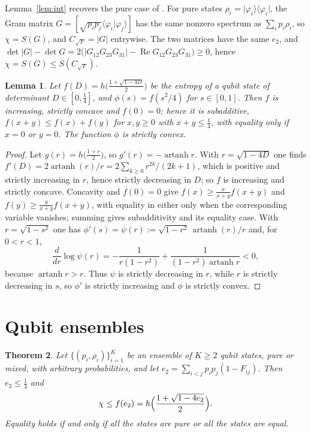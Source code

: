 \documentclass[11pt,a4paper]{article}
\newtheorem{theorem}{Theorem}
\newtheorem{lemma}[theorem]{Lemma}
\theoremstyle{definition}
\theoremstyle{plain}
\DeclareMathOperator{\artanh}{artanh}
\newcommand{\ket}[1]{\lvert#1\rangle}
\newcommand{\bra}[1]{\langle#1\rvert}
\newcommand{\braket}[2]{\langle#1\vert#2\rangle}
\newcommand{\CF}{C_{\sqrt F}}
\begin{document}
Lemma~\ref{lem:int} recovers the pure case of \cite{FdMRZ2012}. For pure
states $\rho_i=\ket{\varphi_i}\bra{\varphi_i}$, the Gram matrix
$G=[\sqrt{p_ip_j}\braket{\varphi_i}{\varphi_j}]$ has the same nonzero spectrum
as $\sum_ip_i\rho_i$, so $\chi=S(G)$, and $\CF=|G|$ entrywise. The two
matrices have the same $e_2$, and
$\det|G|-\det G=2\bigl(|G_{12}G_{23}G_{31}|-\operatorname{Re}G_{12}G_{23}G_{31}\bigr)\ge0$,
hence $\chi=S(G)\le S(\CF)$.

\begin{lemma}\label{lem:qubit}
Let $f(D)=h\bigl(\tfrac{1+\sqrt{1-4D}}{2}\bigr)$ be the entropy of a qubit
state of determinant $D\in[0,\tfrac14]$, and $\phi(s)=f(s^2/4)$ for
$s\in[0,1]$. Then $f$ is increasing, strictly concave and $f(0)=0$; hence it
is subadditive, $f(x+y)\le f(x)+f(y)$ for $x,y\ge0$ with $x+y\le\tfrac14$, with
equality only if $x=0$ or $y=0$. The function $\phi$ is strictly convex.
\end{lemma}

\begin{proof}
Let $g(r)=h\bigl(\tfrac{1+r}{2}\bigr)$, so $g'(r)=-\artanh r$. With
$r=\sqrt{1-4D}$ one finds $f'(D)=2\artanh(r)/r=2\sum_{k\ge0}r^{2k}/(2k+1)$,
which is positive and strictly increasing in $r$, hence strictly decreasing in
$D$; so $f$ is increasing and strictly concave. Concavity and $f(0)=0$ give
$f(x)\ge\frac{x}{x+y}f(x+y)$ and $f(y)\ge\frac{y}{x+y}f(x+y)$, with equality in
either only when the corresponding variable vanishes; summing gives
subadditivity and its equality case. With $r=\sqrt{1-s^2}$ one has
$\phi'(s)=\psi(r):=\sqrt{1-r^2}\,\artanh(r)/r$ and, for $0<r<1$,
\[
\frac{d}{dr}\log\psi(r)=-\frac{1}{r(1-r^2)}+\frac{1}{(1-r^2)\artanh r}<0,
\]
because $\artanh r>r$. Thus $\psi$ is strictly decreasing in $r$, while $r$ is
strictly decreasing in $s$, so $\phi'$ is strictly increasing and $\phi$ is
strictly convex.
\end{proof}

\section{Qubit ensembles}
\begin{theorem}\label{thm:qubit}
Let $\{(p_i,\rho_i)\}_{i=1}^K$ be an ensemble of $K\ge2$ qubit states, pure or
mixed, with arbitrary probabilities, and let
$e_2=\sum_{i<j}p_ip_j(1-F_{ij})$. Then $e_2\le\tfrac14$ and
\[
\chi\le f(e_2)=h\Bigl(\frac{1+\sqrt{1-4e_2}}{2}\Bigr).
\]
Equality holds if and only if all the states are pure or all the states are
equal.
\end{theorem}
\end{document}

